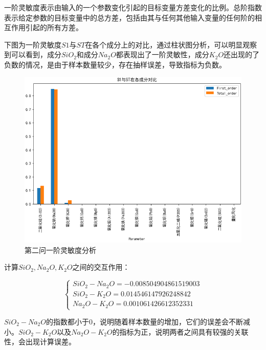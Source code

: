 \documentclass[UTF8]{ctexart}
\begin{document}
        一阶灵敏度表示由输入的一个参数变化引起的目标变量方差变化的比例。总阶指数表示给定参数的目标变量中的总方差，包括由其与任何其他输入变量的任何阶的相互作用引起的所有方差。

        下图为一阶灵敏度$S1$与$ST$在各个成分上的对比，通过柱状图分析，可以明显观察到可以看到，成分$SiO_2$和成分$Na_2O$都表现出了一阶灵敏性，成分$K_2O$还出现的了负数的情况，是由于样本数量较少，存在抽样误差，导致指标为负数。
        \begin{figure}[H]\centering
            \includegraphics[width=1\textwidth,height=0.7\textwidth]{img/S1.png} %
            \caption{第二问一阶灵敏度分析} %
            \label{fig:figure 6} %
        \end{figure}

        计算$SiO_2,Na_2O,K_2O$之间的交互作用：


\[\left\{\begin{array}{llcl}
        SiO_2-Na_2O = -0.008504904861519003 \\
        SiO_2-K_2O =	0.014546147926248842    \\
        Na_2O-K_2O = 0.001061426612352331
    \end{array} \right.\]


$SiO_2-Na_2O$的指数都小于0，说明随着样本数量的增加，它们的误差会不断减小。$SiO_2-K_2O$以及$Na_2O-K_2O$的指标为正，说明两者之间具有较强的关联性，会出现计算误差。
\end{document}
